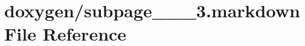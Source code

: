 \hypertarget{subpage__1__1__3_8markdown}{}\section{doxygen/subpage\+\_\+\_\+\_\+3.markdown File Reference}
\label{subpage__1__1__3_8markdown}
